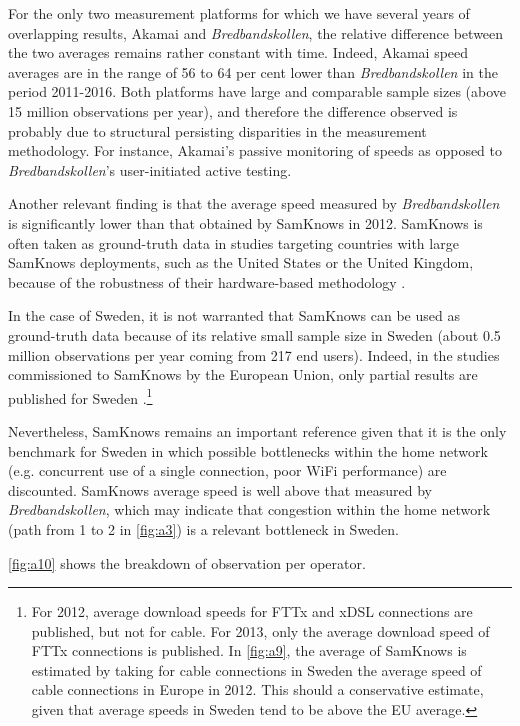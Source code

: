 \documentclass[12pt]{article}
\begin{document}
For the only two measurement platforms for which we have several years of overlapping results, Akamai and \textit{Bredbandskollen}, the relative difference between the two averages remains rather constant with time. Indeed, Akamai speed averages are in the range of 56 to 64 per cent lower than \textit{Bredbandskollen} in the period 2011-2016. Both platforms have large and comparable sample sizes (above 15 million observations per year), and therefore the difference observed is probably due to structural persisting disparities in the measurement methodology. For instance, Akamai's passive monitoring of speeds as opposed to \textit{Bredbandskollen}'s user-initiated active testing.

Another relevant finding is that the average speed measured by \textit{Bredbandskollen} is significantly lower than that obtained by SamKnows in 2012. SamKnows is often taken as ground-truth data in studies targeting countries with large SamKnows deployments, such as the United States or the United Kingdom, because of the robustness of their hardware-based methodology \citep{riddlesden2014,canadi2012}. 

In the case of Sweden, it is not warranted that SamKnows can be used as ground-truth data because of its relative small sample size in Sweden (about 0.5 million observations per year coming from 217 end users). Indeed, in the studies commissioned to SamKnows by the European Union, only partial results are published for Sweden \citep{samknows2012,samknows2013}.\footnote{For 2012, average download speeds for FTTx and xDSL connections are published, but not for cable. For 2013, only the average download speed of FTTx connections is published. In \autoref{fig:a9}, the average of SamKnows is estimated by taking for cable connections in Sweden the average speed of cable connections in Europe in 2012. This should a conservative estimate, given that average speeds in Sweden tend to be above the EU average.} 

Nevertheless, SamKnows remains an important reference given that it is the only benchmark for Sweden in which possible bottlenecks within the home network (e.g. concurrent use of a single connection, poor WiFi performance) are discounted. SamKnows average speed is well above that measured by \textit{Bredbandskollen}, which may indicate that congestion within the home network (path from 1 to 2 in \autoref{fig:a3}) is a relevant bottleneck in Sweden.      
          
\autoref{fig:a10} shows the breakdown of observation per operator. 
 
\end{document}
